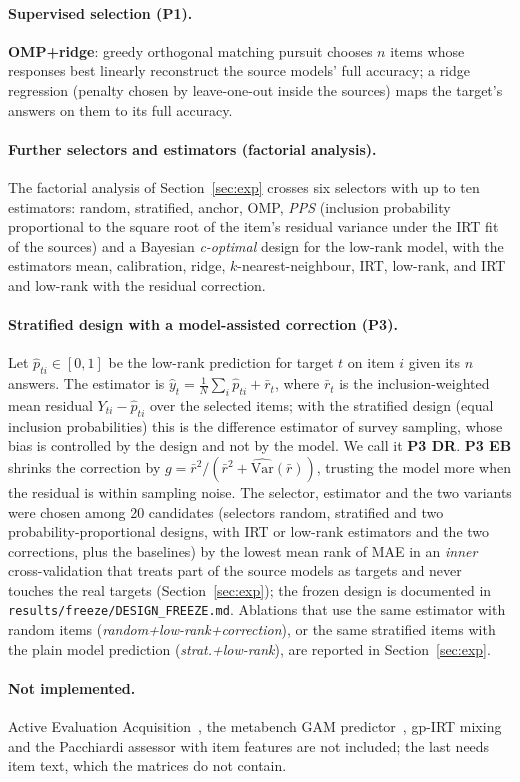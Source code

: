 \paragraph{Supervised selection (P1).}
\textbf{OMP+ridge}: greedy orthogonal matching pursuit chooses $n$ items whose responses best linearly reconstruct the source models' full accuracy; a ridge regression (penalty chosen by leave-one-out inside the sources) maps the target's answers on them to its full accuracy.

\paragraph{Further selectors and estimators (factorial analysis).}
The factorial analysis of Section~\ref{sec:exp} crosses six selectors with up to ten estimators: random, stratified, anchor, OMP, \emph{PPS} (inclusion probability proportional to the square root of the item's residual variance under the IRT fit of the sources) and a Bayesian \emph{c-optimal} design for the low-rank model, with the estimators mean, calibration, ridge, $k$-nearest-neighbour, IRT, low-rank, and IRT and low-rank with the residual correction.

\paragraph{Stratified design with a model-assisted correction (P3).}
Let $\hat p_{ti}\in[0,1]$ be the low-rank prediction for target $t$ on item $i$ given its $n$ answers. The estimator is $\hat y_t=\frac1N\sum_i \hat p_{ti}+\bar r_t$, where $\bar r_t$ is the inclusion-weighted mean residual $Y_{ti}-\hat p_{ti}$ over the selected items; with the stratified design (equal inclusion probabilities) this is the difference estimator of survey sampling, whose bias is controlled by the design and not by the model. We call it \textbf{P3 DR}. \textbf{P3 EB} shrinks the correction by $g=\bar r^2/(\bar r^2+\widehat{\mathrm{Var}}(\bar r))$, trusting the model more when the residual is within sampling noise. The selector, estimator and the two variants were chosen among 20 candidates (selectors random, stratified and two probability-proportional designs, with IRT or low-rank estimators and the two corrections, plus the baselines) by the lowest mean rank of MAE in an \emph{inner} cross-validation that treats part of the source models as targets and never touches the real targets (Section~\ref{sec:exp}); the frozen design is documented in \texttt{results/freeze/DESIGN\_FREEZE.md}. Ablations that use the same estimator with random items (\emph{random+low-rank+correction}), or the same stratified items with the plain model prediction (\emph{strat.+low-rank}), are reported in Section~\ref{sec:exp}.

\paragraph{Not implemented.}
Active Evaluation Acquisition~\citep{li2025active}, the metabench GAM predictor~\citep{kipnis2025metabench}, gp-IRT mixing and the Pacchiardi assessor with item features are not included; the last needs item text, which the matrices do not contain.
